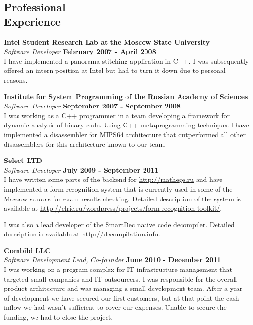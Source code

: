 \documentclass[margin,line]{CV}
\begin{document}
\begin{resume}
    \section{\mysidestyle Professional\\Experience}
    \textbf{Intel Student Research Lab at the Moscow State University} \vspace{2mm}\\\vspace{1mm}%
    \textsl{Software Developer} \hfill \textbf{February 2007 - April 2008}\\
    I have implemented a panorama stitching application in C++. I was subsequently offered an intern position 
	at Intel but had to turn it down due to personal reasons.

	
    \textbf{Institute for System Programming of the Russian Academy of Sciences} \vspace{2mm}\\\vspace{1mm}%
    \textsl{Software Developer} \hfill \textbf{September 2007 - September 2008}\\
    I was working as a C++ programmer in a team developing a framework for dynamic analysis of binary code.
	Using C++ metaprogramming techniques I have implemented a disassembler for MIPS64 architecture that 
	outperformed all other disassemblers for this architecture known to our team.


    \textbf{Select LTD} \vspace{2mm}\\\vspace{1mm}%
    \textsl{Software Developer} \hfill \textbf{July 2009 - September 2011}\\
    I have written some parts of the backend for \url{http://mathege.ru} and have implemented a form recognition system
    that is currently used in some of the Moscow schools for exam results checking. Detailed description of the system is
    available at \url{http://elric.ru/wordpress/projects/form-recognition-toolkit/}. 
	
	I was also a lead developer of the SmartDec native code decompiler. Detailed description is available at 
	\url{http://decompilation.info}.

	\textbf{Combild LLC} \vspace{2mm}\\\vspace{1mm}%
	\textsl{Software Development Lead, Co-founder} \hfill \textbf{June 2010 - December 2011}\\
    I was working on a program complex for IT infrastructure management that targeted small companies and IT outsourcers. I was responsible for the overall product architecture and was managing a small development team. After a year of development we have secured our first customers, but at that point the cash inflow we had wasn't sufficient to cover our expenses. Unable to secure the funding, we had to close the project.


\end{resume}
\end{document}
